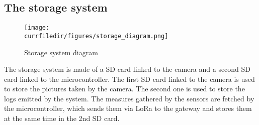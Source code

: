 \newpage
\subsection{The storage system}

\begin{figure}[!h]
    \centering
    \texttt{[image: \\currfiledir/figures/storage\_diagram.png]}
    \caption{Storage system diagram}
\end{figure}
The storage system is made of a SD card linked to the camera and a second SD card linked to the microcontroller. The first SD card linked to the camera is used to store the pictures taken by the camera. The second one is used to store the logs emitted by the system.
The measures gathered by the sensors are fetched by the microcontroller, which sends them via LoRa to the gateway and stores them at the same time in the 2nd SD card.